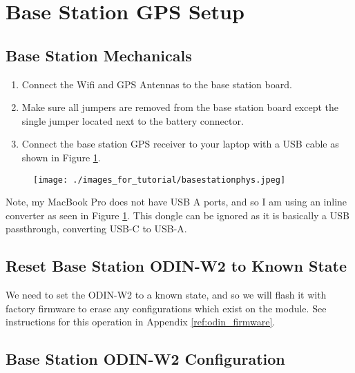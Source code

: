 \documentclass{article}%
\begin{document}
\section{Base Station GPS Setup}
\subsection{Base Station Mechanicals}
	\begin{enumerate}
		\item Connect the Wifi and GPS Antennas to the base station board.
		\item Make sure all jumpers are removed from the base station board except the single jumper located next to the battery connector.
		\item Connect the base station GPS receiver to your laptop with a USB cable as shown in Figure \ref{fig:phys}.
	\end{enumerate}
	
	\begin{figure}
	\centering
	\begin{minipage}{.5\textwidth}
	  \centering
	  \texttt{[image: ./images\_for\_tutorial/basestationphys.jpeg]}
	  \label{fig:phys}
	\end{minipage}%
	\end{figure}
	
	
	\begin{myquote}
		Note, my MacBook Pro does not have USB A ports, and so I am using an inline converter as seen in Figure \ref{fig:phys}. This dongle can be ignored as it is basically a USB passthrough, converting USB-C to USB-A.
	\end{myquote}

\subsection{Reset Base Station ODIN-W2 to Known State}
We need to set the ODIN-W2 to a known state, and so we will flash it with factory firmware to erase any configurations which exist on the module.  See instructions for this operation in Appendix \ref{ref:odin_firmware}.

\subsection{Base Station ODIN-W2 Configuration}
	
\end{document}
